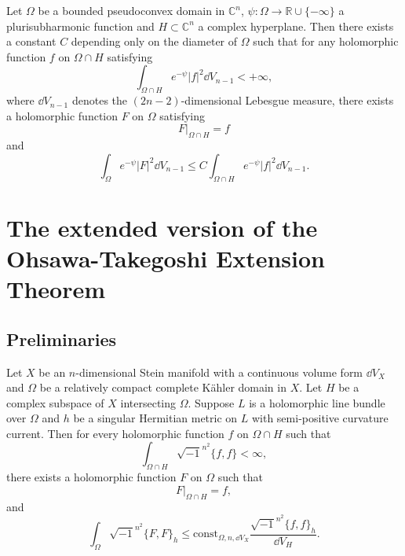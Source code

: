 \documentclass[lang=en,12pt]{beautybook}
\begin{document}
\begin{theorem}
    Let $\Omega$ be a bounded pseudoconvex domain in $\mathbb{C}^n$, $\psi\colon \Omega\to\mathbb{R}\cup \{-\infty\}$ a
    plurisubharmonic function and $H\subset \mathbb{C}^n$ a complex hyperplane. Then there exists a constant $C$ depending only on the diameter of $\Omega$ such that for any holomorphic function $f$ on $\Omega\cap H$ satisfying 
    \[
        \int_{\Omega\cap H} e^{-\psi} |f|^2 \dd V_{n-1}<+\infty,
    \]
    where $\dd V_{n-1}$ denotes the $(2n-2)$-dimensional Lebesgue measure, there exists a holomorphic function $F$ on $\Omega$ satisfying 
    \[F|_{\Omega\cap H}=f\]
     and 
    \[
        \int_{\Omega} e^{-\psi} |F|^2 \dd V_{n-1} \leqslant C \int_{\Omega\cap H} e^{-\psi} |f|^2 \dd V_{n-1}.
    \]
\end{theorem}

\chapter{The extended version of the Ohsawa-Takegoshi Extension Theorem}
\section{Preliminaries}

\begin{theorem}
  Let $X$ be an $n$-dimensional Stein manifold with a continuous volume form $\dd V_X$ and $\Omega$ be a relatively compact complete K\"ahler domain in $X$. Let $H$ be a complex subspace of $X$ intersecting $\Omega$.  Suppose $L$ is a holomorphic line bundle over $\Omega$ and $h$ be a singular Hermitian metric on $L$ with semi-positive curvature current. Then for every holomorphic function $f$ on $\Omega\cap H$ such that 
  \[
    \int_{\Omega\cap H} \sqrt{-1}^{n^2} \{f,f\}<\infty,
  \] 
  there exists a holomorphic function $F$ on $\Omega$ such that 
  \[
    F|_{\Omega\cap H} = f,
  \]
  and 
  \[\int_{\Omega} \sqrt{-1}^{n^2} \{F,F\}_h \leqslant  \textrm{const}_{\Omega,n,\dd V_X} \frac{\sqrt{-1}^{n^2} \{f,f\}_h}{\dd V_{H}}.\]
\end{theorem}

\end{document}
